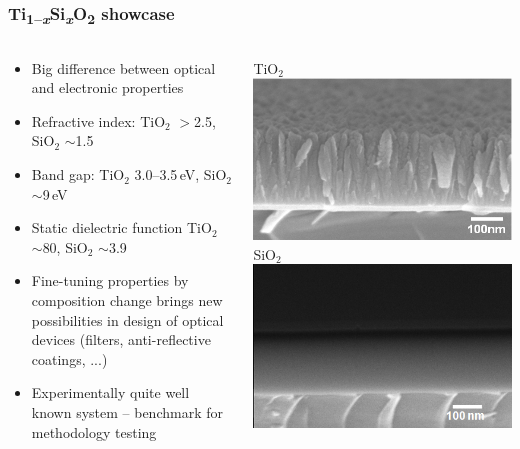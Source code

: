 \documentclass[noamsthm,8pt,t,xcolor={dvipsnames}]{beamer}
\def\TiSiO{Ti\textsubscript{1--\itshape x}Si\textsubscript{\itshape x}O\textsubscript{2}}
\begin{document}
\begin{frame}
   \frametitle{\TiSiO{} showcase}
   \begin{columns}
      \begin{column}{0.6\textwidth}
         \vspace{1cm}
         \begin{itemize}
            \item Big difference between optical and electronic properties
            \item Refractive index: TiO$_2$ $>$2.5, SiO$_2$ $\sim$1.5
            \item Band gap: TiO$_2$ 3.0--3.5\,eV, SiO$_2$ $\sim$9\,eV
            \item Static dielectric function TiO$_2$ $\sim$80, SiO$_2$ $\sim$3.9
            \item Fine-tuning properties by composition change brings new possibilities in design of optical devices (filters, anti-reflective coatings, ...)
            \item Experimentally quite well known system -- benchmark for methodology testing
         \end{itemize}
      \end{column}
      \begin{column}{0.4\textwidth}
         \begin{center}
            TiO$_2$
            \includegraphics[width=\linewidth]{figures/SEM-Xsection-TiO2.png}
            \vspace{0.3cm}
            SiO$_2$
            \includegraphics[width=\linewidth]{figures/SEM-Xsection-SiO2.png}

\end{center}
\end{column}
\end{columns}
\end{frame}
\end{document}

